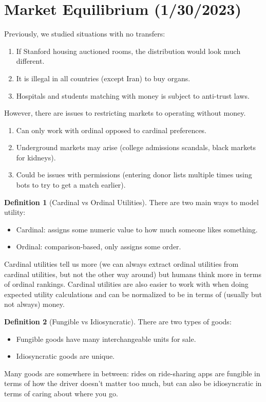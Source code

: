 \documentclass[dvipsnames]{article}
\theoremstyle{definition}
\newtheorem{definition}{Definition}[section]
\theoremstyle{remark}
\begin{document}
\newpage

\section{Market Equilibrium (1/30/2023)}

Previously, we studied situations with no transfers:
\begin{enumerate}
	\item If Stanford housing auctioned rooms, the distribution would look much different.
	\item It is illegal in all countries (except Iran) to buy organs.
	\item Hospitals and students matching with money is subject to anti-trust laws.
\end{enumerate}
However, there are issues to restricting markets to operating without money.
\begin{enumerate}
	\item Can only work with ordinal opposed to cardinal preferences.
	\item Underground markets may arise (college admissions scandals, black markets for kidneys).
	\item Could be issues with permissions (entering donor lists multiple times using bots to try to get a match earlier).
\end{enumerate}

\begin{definition}[Cardinal vs Ordinal Utilities]
	There are two main ways to model utility:
	\begin{itemize}
		\item Cardinal: assigns some numeric value to how much someone likes something.
		\item Ordinal: comparison-based, only assigns some order.
	\end{itemize}
	Cardinal utilities tell us more (we can always extract ordinal utilities from cardinal utilities, but not the other way around) but humans think more in terms of ordinal rankings. Cardinal utilities are also easier to work with when doing expected utility calculations and can be normalized to be in terms of (usually but not always) money.
\end{definition}

\begin{definition}[Fungible vs Idiosyncratic]
	There are two types of goods:
	\begin{itemize}
		\item Fungible goods have many interchangeable units for sale.
		\item Idiosyncratic goods are unique.
	\end{itemize}
	Many goods are somewhere in between: rides on ride-sharing apps are fungible in terms of how the driver doesn't matter too much, but can also be idiosyncratic in terms of caring about where you go.
\end{definition}
\end{document}
